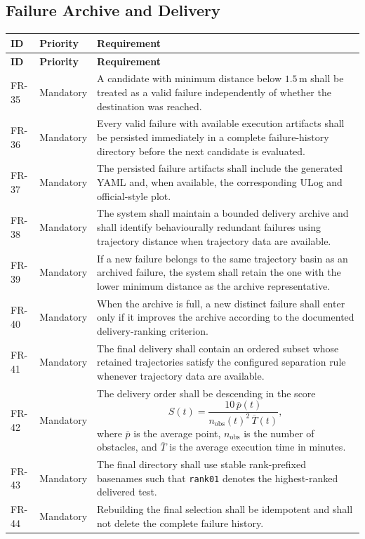 \documentclass[11pt,a4paper,openany]{report}
\begin{document}
\subsection{Failure Archive and Delivery}
\begin{longtable}{L{1.7cm} L{2.1cm} L{10.8cm}}
\toprule
\textbf{ID} & \textbf{Priority} & \textbf{Requirement}\\
\midrule
\endfirsthead
\toprule
\textbf{ID} & \textbf{Priority} & \textbf{Requirement}\\
\midrule
\endhead
FR-35 & Mandatory & A candidate with minimum distance below $1.5\,\mathrm{m}$ shall be treated as a valid failure independently of whether the destination was reached.\\
FR-36 & Mandatory & Every valid failure with available execution artifacts shall be persisted immediately in a complete failure-history directory before the next candidate is evaluated.\\
FR-37 & Mandatory & The persisted failure artifacts shall include the generated YAML and, when available, the corresponding ULog and official-style plot.\\
FR-38 & Mandatory & The system shall maintain a bounded delivery archive and shall identify behaviourally redundant failures using trajectory distance when trajectory data are available.\\
FR-39 & Mandatory & If a new failure belongs to the same trajectory basin as an archived failure, the system shall retain the one with the lower minimum distance as the archive representative.\\
FR-40 & Mandatory & When the archive is full, a new distinct failure shall enter only if it improves the archive according to the documented delivery-ranking criterion.\\
FR-41 & Mandatory & The final delivery shall contain an ordered subset whose retained trajectories satisfy the configured separation rule whenever trajectory data are available.\\
FR-42 & Mandatory & The delivery order shall be descending in the score
\[
S(t)=\frac{10\,\overline{p}(t)}{n_{\mathrm{obs}}(t)^2\,\overline{T}(t)},
\]
where $\overline{p}$ is the average point, $n_{\mathrm{obs}}$ is the number of obstacles, and $\overline{T}$ is the average execution time in minutes.\\
FR-43 & Mandatory & The final directory shall use stable rank-prefixed basenames such that \texttt{rank01} denotes the highest-ranked delivered test.\\
FR-44 & Mandatory & Rebuilding the final selection shall be idempotent and shall not delete the complete failure history.\\
\bottomrule
\end{longtable}
\end{document}
